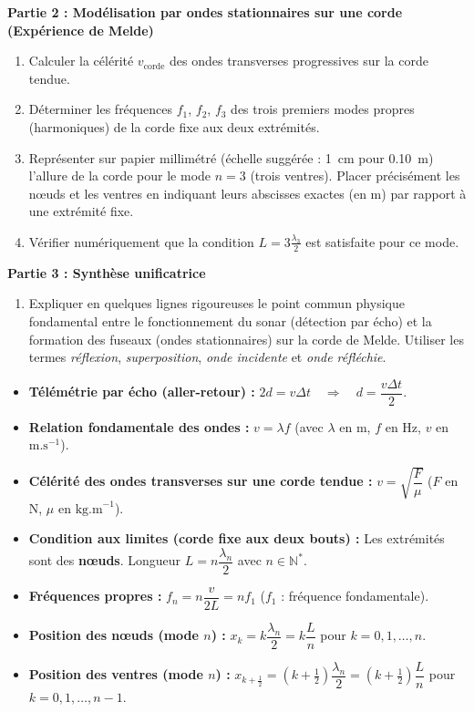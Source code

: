 \documentclass[11pt]{article}
\newcounter{popsec}
\newcounter{popsub}
\newcommand{\courssub}[1]{%
  \stepcounter{popsub}%
  \par\vspace{9pt}\noindent{\popxbold\fontsize{11.5}{13}\selectfont\color{popink}{\color{poporange}\thepopsec.\thepopsub}\hspace{6pt}#1}\par\nopagebreak\vspace{4pt}
}
\begin{document}
\textbf{Partie 2 : Modélisation par ondes stationnaires sur une corde (Expérience de Melde)}
\begin{enumerate}
    \item Calculer la célérité $v_{\text{corde}}$ des ondes transverses progressives sur la corde tendue.
    \item Déterminer les fréquences $f_1$, $f_2$, $f_3$ des trois premiers modes propres (harmoniques) de la corde fixe aux deux extrémités.
    \item Représenter sur papier millimétré (échelle suggérée : \SI{1}{cm} pour \SI{0,10}{m}) l'allure de la corde pour le mode $n=3$ (trois ventres). Placer précisément les nœuds et les ventres en indiquant leurs abscisses exactes (en m) par rapport à une extrémité fixe.
    \item Vérifier numériquement que la condition $L = 3\frac{\lambda_3}{2}$ est satisfaite pour ce mode.
\end{enumerate}

\textbf{Partie 3 : Synthèse unificatrice}
\begin{enumerate}
    \item Expliquer en quelques lignes rigoureuses le point commun physique fondamental entre le fonctionnement du sonar (détection par écho) et la formation des fuseaux (ondes stationnaires) sur la corde de Melde. Utiliser les termes \emph{réflexion}, \emph{superposition}, \emph{onde incidente} et \emph{onde réfléchie}.
\end{enumerate}

\courssub{Ressources à mobiliser}
\begin{propriete}
\begin{itemize}
    \item \textbf{Télémétrie par écho (aller-retour) :} $2d = v \Delta t \quad \Rightarrow \quad d = \dfrac{v \Delta t}{2}$.
    \item \textbf{Relation fondamentale des ondes :} $v = \lambda f$ (avec $\lambda$ en m, $f$ en Hz, $v$ en $\text{m.s}^{-1}$).
    \item \textbf{Célérité des ondes transverses sur une corde tendue :} $v = \sqrt{\dfrac{F}{\mu}}$ ($F$ en N, $\mu$ en $\text{kg.m}^{-1}$).
    \item \textbf{Condition aux limites (corde fixe aux deux bouts) :} Les extrémités sont des \textbf{nœuds}. Longueur $L = n\dfrac{\lambda_n}{2}$ avec $n \in \mathbb{N}^*$.
    \item \textbf{Fréquences propres :} $f_n = n\dfrac{v}{2L} = n f_1$ ($f_1$ : fréquence fondamentale).
    \item \textbf{Position des nœuds (mode $n$) :} $x_k = k\dfrac{\lambda_n}{2} = k\dfrac{L}{n}$ pour $k = 0, 1, \dots, n$.
    \item \textbf{Position des ventres (mode $n$) :} $x_{k+\frac{1}{2}} = \left(k+\frac{1}{2}\right)\dfrac{\lambda_n}{2} = \left(k+\frac{1}{2}\right)\dfrac{L}{n}$ pour $k = 0, 1, \dots, n-1$.
\end{itemize}
\end{propriete}
\end{document}
